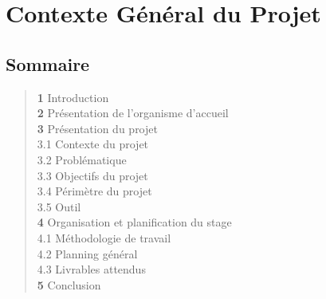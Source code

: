 
\chapter{Contexte Général du Projet}
\section*{Sommaire}
\begin{quote}
\small
\textbf{1} \hspace{1em} Introduction \dotfill \pageref{sec:intro_ch1}\\
\textbf{2} \hspace{1em} Présentation de l'organisme d'accueil \dotfill \pageref{sec:entreprise}\\
\textbf{3} \hspace{1em} Présentation du projet \dotfill \pageref{sec:projet}\\
\hspace{2.5em} 3.1 \hspace{0.5em} Contexte du projet \dotfill \pageref{subsec:contexte}\\
\hspace{2.5em} 3.2 \hspace{0.5em} Problématique \dotfill \pageref{subsec:problematique}\\
\hspace{2.5em} 3.3 \hspace{0.5em} Objectifs du projet \dotfill \pageref{subsec:objectifs}\\
\hspace{2.5em} 3.4 \hspace{0.5em} Périmètre du projet \dotfill \pageref{subsec:perimetre}\\
\hspace{2.5em} 3.5 \hspace{0.5em} Outil \dotfill \pageref{subsec:qqoqcp}\\
\textbf{4} \hspace{1em} Organisation et planification du stage \dotfill \pageref{sec:organisation}\\
\hspace{2.5em} 4.1 \hspace{0.5em} Méthodologie de travail \dotfill \pageref{subsec:methodo}\\
\hspace{2.5em} 4.2 \hspace{0.5em} Planning général \dotfill \pageref{subsec:planning}\\
\hspace{2.5em} 4.3 \hspace{0.5em} Livrables attendus \dotfill \pageref{subsec:livrables}\\
\textbf{5} \hspace{1em} Conclusion \dotfill \pageref{sec:conclu_ch1}\\
\end{quote}

